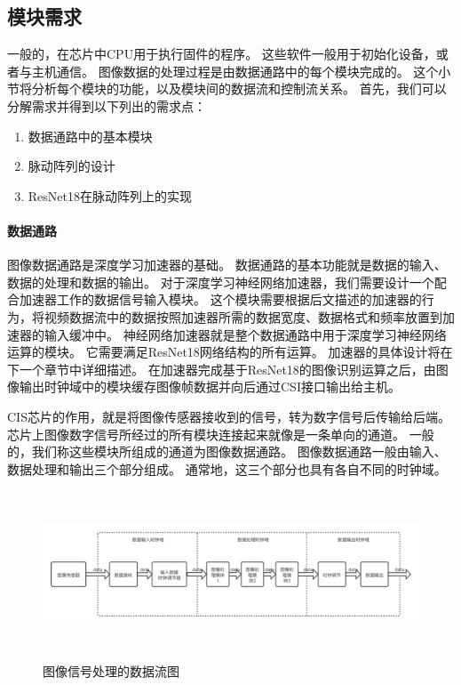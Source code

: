 \subsection{模块需求}

一般的，在芯片中CPU用于执行固件的程序。
这些软件一般用于初始化设备，或者与主机通信。
图像数据的处理过程是由数据通路中的每个模块完成的。
这个小节将分析每个模块的功能，以及模块间的数据流和控制流关系。
首先，我们可以分解需求并得到以下列出的需求点：
\begin{enumerate}
    \item 数据通路中的基本模块
    \item 脉动阵列的设计
    \item ResNet18在脉动阵列上的实现
\end{enumerate}    

\paragraph{数据通路}
图像数据通路是深度学习加速器的基础。
数据通路的基本功能就是数据的输入、数据的处理和数据的输出。
对于深度学习神经网络加速器，我们需要设计一个配合加速器工作的数据信号输入模块。
这个模块需要根据后文描述的加速器的行为，将视频数据流中的数据按照加速器所需的数据宽度、数据格式和频率放置到加速器的输入缓冲中。
神经网络加速器就是整个数据通路中用于深度学习神经网络运算的模块。
它需要满足ResNet18网络结构的所有运算。
加速器的具体设计将在下一个章节中详细描述。
在加速器完成基于ResNet18的图像识别运算之后，由图像输出时钟域中的模块缓存图像帧数据并向后通过CSI接口输出给主机。


CIS芯片的作用，就是将图像传感器接收到的信号，转为数字信号后传输给后端。
芯片上图像数字信号所经过的所有模块连接起来就像是一条单向的通道。
一般的，我们称这些模块所组成的通道为图像数据通路。
图像数据通路一般由输入、数据处理和输出三个部分组成。
通常地，这三个部分也具有各自不同的时钟域。

\begin{figure}[htbp]
    \centering
    \includegraphics[width=15cm,height=5cm]{figures/datapath.png}
    \caption{图像信号处理的数据流图}
    \label{fig:datapath}
\end{figure}

